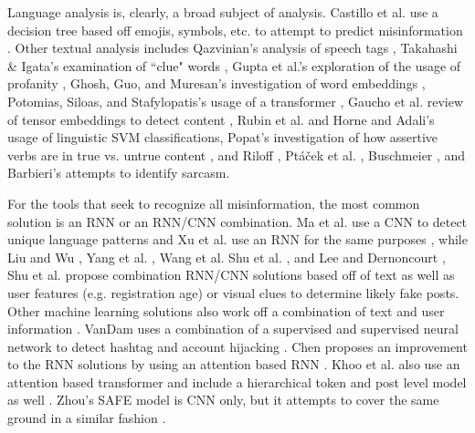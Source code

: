 \documentclass[preprint,review,12pt]{elsarticle}
\begin{document}
Language analysis is, clearly, a broad subject of analysis.  Castillo et al. use a decision tree based off emojis, symbols, etc. to attempt to predict misinformation \cite{castillo2011information}. Other textual analysis includes Qazvinian's analysis of speech tags \cite{qazvinian2011rumor}, Takahashi \& Igata's examination of ``clue" words \cite{takahashi2012rumor}, Gupta et al.'s exploration of the usage of profanity \cite{gupta2014tweetcred}, Ghosh, Guo, and Muresan's investigation of word embeddings \cite{ghosh2015sarcastic}, Potomias, Siloas, and Stafylopatis's usage of a transformer \cite{potamias2020transformer}, Gaucho et al. review of tensor embeddings to detect content \cite{guacho2018semi}, Rubin et al. \cite{rubin2016fake} and Horne and Adali's \cite{horne2017just} usage of linguistic SVM classifications, Popat's investigation of how assertive verbs are in true vs. untrue content \cite{popat2017assessing}, and Riloff \cite{riloff2013sarcasm}, Pt{\'a}{\v{c}}ek et al. \cite{ptavcek2014sarcasm}, Buschmeier \cite{buschmeier2014impact}, and Barbieri's \cite{barbieri2014modelling} attempts to identify sarcasm.



For the tools that seek to recognize all misinformation, the most common solution is an RNN or an RNN/CNN combination. Ma et al. use a CNN to detect unique language patterns \cite{ma2018rumor} and Xu et al. use an RNN for the same purposes \cite{xu2019deep}, while Liu and Wu \cite{liu2018early}, Yang et al. \cite{yang2012automatic}, Wang et al. \cite{wang2018eann} Shu et al. \cite{shu2019role}, and Lee and Dernoncourt \cite{lee2016sequential}, Shu et al. \cite{shu2019beyond,shu2020leveraging} propose combination RNN/CNN solutions based off of text as well as user features (e.g. registration age) or visual clues to determine likely fake posts.  Other machine learning solutions also work off a combination of text and user information \cite{sun2013detecting,kwon2017rumor,ma2015detect,ma2016detecting,zhao2015enquiring}. VanDam uses a combination of a supervised and supervised neural network to detect hashtag and account hijacking \cite{vandam2019learning}. Chen proposes an improvement to the RNN solutions by using an attention based RNN \cite{chen2018call}. Khoo et al. also use an attention based transformer and include a hierarchical token and post level model as well \cite{khoo2020interpretable}. Zhou's SAFE model is CNN only, but it attempts to cover the same ground in a similar fashion \cite{zhou2020mathsf}.
\end{document}
